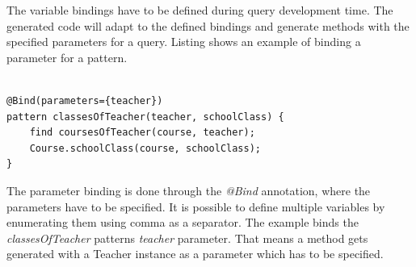 The variable bindings have to be defined during query development time. The
generated code will adapt to the defined bindings and generate methods with the
specified parameters for a query. Listing  shows an
example of binding a parameter for a pattern.

\begin{lstlisting}[frame=single,float=!ht,language=IQPL,
label=listing:pattern_binding, caption=Binding of a parameter]

@Bind(parameters={teacher})
pattern classesOfTeacher(teacher, schoolClass) {
	find coursesOfTeacher(course, teacher);
	Course.schoolClass(course, schoolClass);
}

\end{lstlisting}

The parameter binding is done through the \emph{@Bind} annotation, where the
parameters have to be specified. It is possible to define multiple variables by
enumerating them using comma as a separator. The example binds the
\emph{classesOfTeacher} patterns \emph{teacher} parameter. That means a method
gets generated with a Teacher instance as a parameter which has to be specified.
